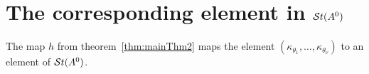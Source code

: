 \begin{comment}
  Let $I\subset\{1,\dots,n\}^2\backslash\{(j,j)\mid j\in\{1,\dots,n\}\}$ which
  satisfies
  \begin{enumerate}
    \item if $(a,b)\in I$ then $(b,a)\notin I$
  \end{enumerate}
  and let $I_1$ and $I_2$ be two disjoint subsets of $I$.
  Let $K_1$ and $K_2$ be two matrices of the form
  \[
    K_i\in\left\{K\in G\mid K_{jl}=\partial_{jl}\text{ unless } (j,l)\in
    I_i\right\}
  \]
  \begin{prop}
    The matrices $A_1A_2$ and $A_2A_1$ are elements of
  \[
    \left\{K\in G\mid K_{jl}=\partial_{jl}\text{ unless } (j,l)\in I\right\}\,.
  \]
  \end{prop}
  \begin{proof}
    Denote by $(A_1A_2)_{jl}$ the entry at the position $(j,l)$ in the matrix
    $A_1A_2$.

    Define the set $\tilde I$ as
    \[
      \tilde I_{jl}:=\left\{
        k\in\{1,\dots,n\}\mid (j,k)\in I_1 \text{~and~} (k,l)\in I_2
      \right\}\,.
    \]
    
    Then
    \begin{align*}
      (A_1A_2)_{jl}
      &=\sum_{k\in\{1,\dots,n\}}(A_1)_{jk}(A_2)_{kl}
    \\&= \begin{cases}
    1 +\sum_{k\in\tilde I_{jl}}(A_1)_{jk}(A_2)_{kl}\overset{!}{=}1
      & \text{, if } j=l
    \\\sum_{k\in\tilde I_{jl}}(A_1)_{jk}(A_2)_{kl}
      \overset{!}{=}0 & \text{, if } (j,l)\notin I \text{~and~}j\neq l
    \\(A_1)_{jl}\cdot1
      +1\cdot(A_2)_{jl}
      +\sum_{k\in\tilde I_{jl}}(A_1)_{jk}(A_2)_{kl} = \star
      & \text{, if } (j,l)\in I
    \end{cases}
    \end{align*}
    Thus we have to proof that if $(j,l)\notin I$ then 
    $\sum_{k\in\tilde I_{jl}}(A_1)_{jk}(A_2)_{kl}=0$ which is equivalent to
    proof, that
    \begin{einr}
      $\forall k\in\tilde I_{jl}:\, (A_1)_{jk}(A_2)_{kl}=0$.
    \end{einr}

    \TODO{}
  \end{proof}
\end{comment}

\section{The corresponding element in $\mathcal{S}{}t(A^0)$}
The map $h$ from theorem~\ref{thm:mainThm2} maps the element
$(\kappa_{\theta_1},\dots,\kappa_{\theta_\nu})$ to an element of $\mathcal{S}{}t(A^0)$.

